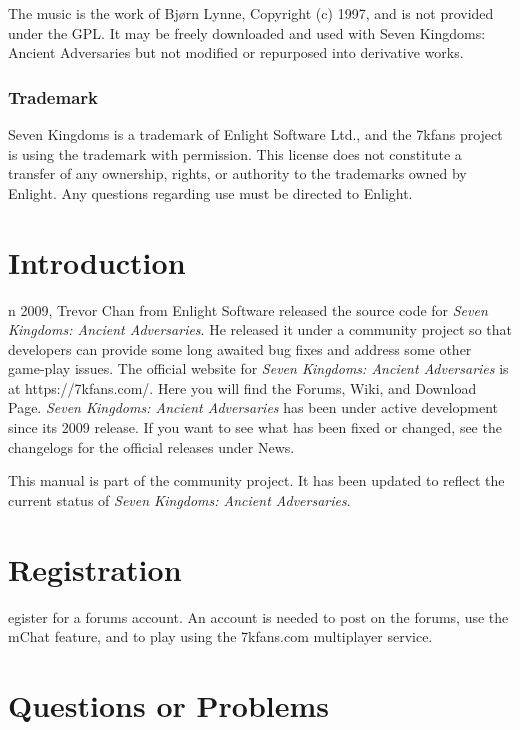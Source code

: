 \documentclass[openany]{book}
\begin{document}
The music is the work of Bjørn Lynne, Copyright (c) 1997, and is not provided under the GPL. It may be freely downloaded and used with Seven Kingdoms: Ancient Adversaries but not modified or repurposed into derivative works.

\subsubsection{Trademark}

Seven Kingdoms is a trademark of Enlight Software Ltd., and the 7kfans project is using the trademark with permission. This license does not constitute a transfer of any ownership, rights, or authority to the trademarks owned by Enlight. Any questions regarding use must be directed to Enlight.

\clearpage

\section{Introduction}

n 2009, Trevor Chan from Enlight Software released the source code for \textit{Seven Kingdoms: Ancient Adversaries}. He released it under a community project so that developers can provide some long awaited bug fixes and address some other game-play issues. The official website for \textit{Seven Kingdoms: Ancient Adversaries} is at https://7kfans.com/. Here you will find the Forums, Wiki, and Download Page. \textit{Seven Kingdoms: Ancient Adversaries} has been under active development since its 2009 release. If you want to see what has been fixed or changed, see the changelogs for the official releases under News. 

This manual is part of the community project. It has been updated to reflect the current status of \textit{Seven Kingdoms: Ancient Adversaries}.

\section{Registration}

egister for a forums account. An account is needed to post on the forums, use the mChat feature, and to play using the 7kfans.com multiplayer service.

\section{Questions or Problems}
\end{document}
